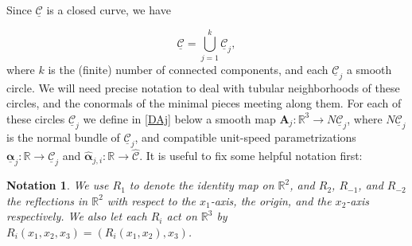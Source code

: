 \documentclass[12pt,namelimits,sumlimits]{amsart}
\newtheorem{notation}[theorem]{Notation}
\theoremstyle{remark}
\numberwithin{equation}{section}
\begin{document}
Since ${\underline{{\mathcal{C}}}}$ is a closed curve, we have 
\addtocounter{theorem}{1}
\begin{equation}
\label{ECj}
{\underline{{\mathcal{C}}}}=\bigcup_{j=1}^k{\underline{{\mathcal{C}}}}_j,
\end{equation}
where $k$ is the (finite) number of connected components,
and each ${\underline{{\mathcal{C}}}}_j$ a smooth circle.
We will need precise notation to deal with tubular neighborhoods of these
circles, and the conormals of the minimal pieces meeting along them.
For each of these circles ${\underline{{\mathcal{C}}}}_j$ we define
in \ref{DAj} below
a smooth map
${\boldsymbol{A}}_j:{\mathbb{R}}^3\to N{\underline{{\mathcal{C}}}}_j$,
where $N{\underline{{\mathcal{C}}}}_j$ is the normal bundle of ${\underline{{\mathcal{C}}}}_j$,
and compatible unit-speed parametrizations
${\underline{\boldsymbol{\alpha}}}_j:{\mathbb{R}}\to{\underline{{\mathcal{C}}}}_j$ 
and
${\widehat{\boldsymbol{\alpha}}}_{j,i}:{\mathbb{R}}\to{{\widehat{{\mathcal{C}}}}}$.
It is useful to fix some helpful notation first:

\addtocounter{equation}{1}
\begin{notation}
\label{NR}
We use $R_1$ to denote the identity map on ${{{\mathbb{R}}^2}}$,
and $R_2$, $R_{-1}$, and $R_{-2}$ the reflections in ${{{\mathbb{R}}^2}}$
with respect to the $x_1$-axis, the origin, and the $x_2$-axis respectively.
We also let each $R_i$ act on ${{{\mathbb{R}}^3}}$ by $R_i(x_1,x_2,x_3)=(R_i(x_1,x_2),x_3)$.
\end{notation}
\end{document}
